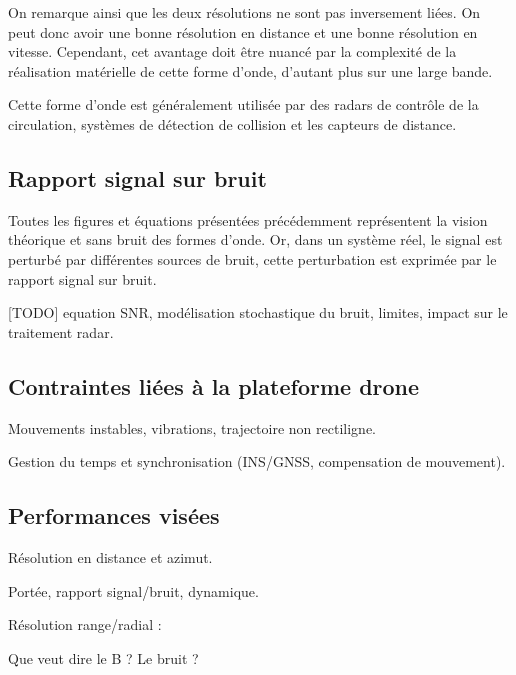 On remarque ainsi que les deux résolutions ne sont pas inversement liées. On peut donc avoir une bonne résolution en distance et une bonne résolution en vitesse. Cependant, cet avantage doit être nuancé par la complexité de la réalisation matérielle de cette forme d'onde, d'autant plus sur une large bande. 

Cette forme d'onde est généralement utilisée par des radars de contrôle de la circulation, systèmes de détection de collision et les capteurs de distance.

\subsection{Rapport signal sur bruit}
Toutes les figures et équations présentées précédemment représentent la vision théorique et sans bruit des formes d'onde. Or, dans un  système réel, le signal est perturbé par différentes sources de bruit, cette perturbation est exprimée par le rapport signal sur bruit.

[TODO] equation SNR, modélisation stochastique du bruit, limites, impact sur le traitement radar.
















\subsection{Contraintes liées à la plateforme drone}

Mouvements instables, vibrations, trajectoire non rectiligne.

Gestion du temps et synchronisation (INS/GNSS, compensation de mouvement).


\subsection{Performances visées}

Résolution en distance et azimut.

Portée, rapport signal/bruit, dynamique.






\newpage


Résolution range/radial :

Que veut dire le B ? Le bruit ? 


